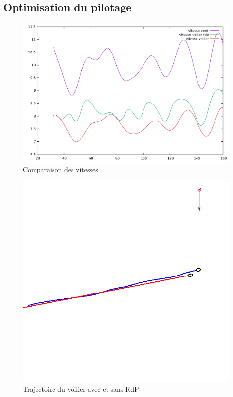 \documentclass{beamer}
\begin{document}
\subsection{Optimisation du pilotage}

\begin{frame}
\begin{figure}
\includegraphics[scale=0.4]{vitesses.pdf} 
\caption{Comparaison des vitesses}
\end{figure}
\end{frame}

\begin{frame}[plain]
\begin{figure}
\includegraphics[scale=0.35]{Screenshot3.png} 
\caption{Trajectoire du voilier avec et sans RdP}
\end{figure}
\end{frame}
\end{document}
